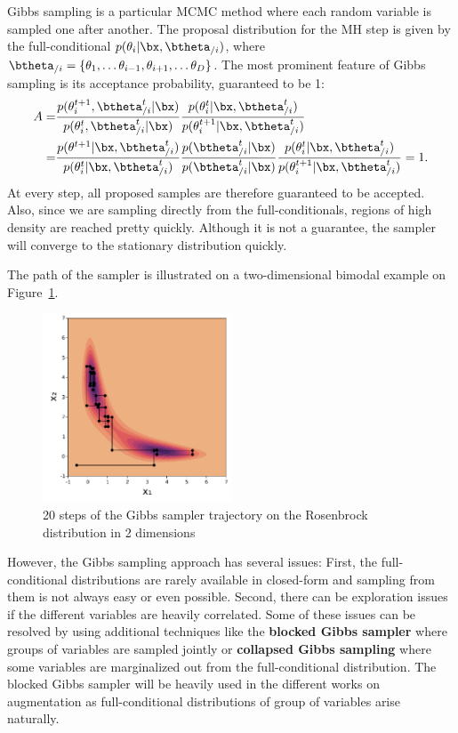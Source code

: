 Gibbs sampling is a particular \ac{MCMC} method where each random variable is sampled one after another.
The proposal distribution for the \ac{MH} step is given by the full-conditional  $p(\theta_i|\bx,\btheta_{/i})$, where $\btheta_{/i}=\{\theta_1, \ldots \theta_{i-1}, \theta_{i+1},\ldots \theta_{D}\}$.
The most prominent feature of Gibbs sampling is its acceptance probability, guaranteed to be 1:
\begin{align*}
    A =& \frac{p(\theta^{t+1}_i,\btheta^t_{/i}|\bx)}{p(\theta^t_i,\btheta^t_{/i}|\bx)}\frac{p(\theta^t_i|\bx,\btheta^{t}_{/i})}{p(\theta^{t+1}_i|\bx,\btheta^t_{/i})}\\
    =& \frac{p(\theta^{t+1}|\bx, \btheta^{t}_{/i})}{p(\theta^t_i|\bx,\btheta^t_{/i})}\frac{p(\btheta^t_{/i}|\bx)}{p(\btheta^t_{/i}|\bx)}\frac{p(\theta^t_i|\bx,\btheta^{t}_{/i})}{p(\theta^{t+1}_i|\bx,\btheta^t_{/i})} = 1.
\end{align*}
At every step, all proposed samples are therefore guaranteed to be accepted.
Also, since we are sampling directly from the full-conditionals, regions of high density are reached pretty quickly.
Although it is not a guarantee, the sampler will converge to the stationary distribution quickly.

The path of the sampler is illustrated on a two-dimensional bimodal example on Figure~\ref{fig:gibbs_samp}.

\begin{figure}
\centering
\includegraphics[width=0.5\textwidth]{./chapters/2_background/figures/gibbs_sampling.pdf}
\caption{20 steps of the Gibbs sampler trajectory on the Rosenbrock distribution in 2 dimensions}
\label{fig:gibbs_samp}
\end{figure}

However, the Gibbs sampling approach has several issues:
First, the full-conditional distributions are rarely available in closed-form and sampling from them is not always easy or even possible.
Second, there can be exploration issues if the different variables are heavily correlated.
Some of these issues can be resolved by using additional techniques like the \textbf{blocked Gibbs sampler} \needcite where groups of variables are sampled jointly or \textbf{collapsed Gibbs sampling} \cite{liu1994collapsed} where some variables are marginalized out from the full-conditional distribution.
The blocked Gibbs sampler will be heavily used in the different works on augmentation as full-conditional distributions of group of variables arise naturally.

